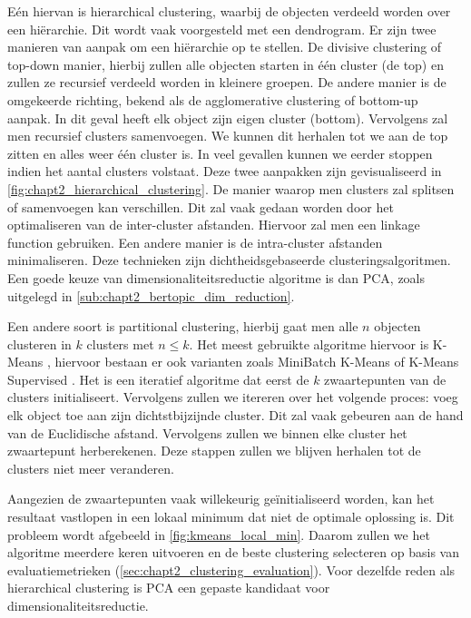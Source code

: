 Eén hiervan is hierarchical clustering, waarbij de objecten verdeeld worden over een hiërarchie. Dit wordt vaak voorgesteld met een dendrogram. Er zijn twee manieren van aanpak om een hiërarchie op te stellen. De divisive clustering of top-down manier, hierbij zullen alle objecten starten in één cluster (de top) en zullen ze recursief verdeeld worden in kleinere groepen. De andere manier is de omgekeerde richting, bekend als de agglomerative clustering of bottom-up aanpak. In dit geval heeft elk object zijn eigen cluster (bottom). Vervolgens zal men recursief clusters samenvoegen. We kunnen dit herhalen tot we aan de top zitten en alles weer één cluster is. In veel gevallen kunnen we eerder stoppen indien het aantal clusters volstaat. Deze twee aanpakken zijn gevisualiseerd in \autoref{fig:chapt2_hierarchical_clustering}. 
\newline
De manier waarop men clusters zal splitsen of samenvoegen kan verschillen. Dit zal vaak gedaan worden door het optimaliseren van de inter-cluster afstanden. Hiervoor zal men een linkage function gebruiken. Een andere manier is de intra-cluster afstanden minimaliseren. Deze technieken zijn dichtheidsgebaseerde clusteringsalgoritmen. Een goede keuze van dimensionaliteitsreductie algoritme is dan PCA, zoals uitgelegd in \autoref{sub:chapt2_bertopic_dim_reduction}.


Een andere soort is partitional clustering, hierbij gaat men alle $n$ objecten clusteren in $k$ clusters met $ n \leq k $. Het meest gebruikte algoritme hiervoor is K-Means \cite{paper_kmeans}, hiervoor bestaan er ook varianten zoals MiniBatch K-Means \cite{kmeans_minibatch} of K-Means Supervised \cite{kmeans_supervised}. Het is een iteratief algoritme dat eerst de $k$ zwaartepunten van de clusters initialiseert. Vervolgens zullen we itereren over het volgende proces: voeg elk object toe aan zijn dichtstbijzijnde cluster. Dit zal vaak gebeuren aan de hand van de Euclidische afstand. Vervolgens zullen we binnen elke cluster het zwaartepunt herberekenen. Deze stappen zullen we blijven herhalen tot de clusters niet meer veranderen.

Aangezien de zwaartepunten vaak willekeurig geïnitialiseerd worden, kan het resultaat vastlopen in een lokaal minimum dat niet de optimale oplossing is. Dit probleem wordt afgebeeld in \autoref{fig:kmeans_local_min}. Daarom zullen we het algoritme meerdere keren uitvoeren en de beste clustering selecteren op basis van evaluatiemetrieken (\autoref{sec:chapt2_clustering_evaluation}). Voor dezelfde reden als hierarchical clustering is PCA een gepaste kandidaat voor dimensionaliteitsreductie.


